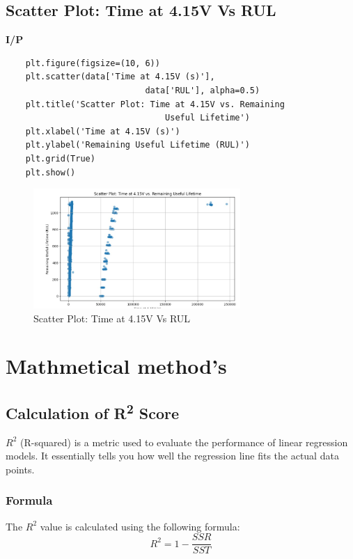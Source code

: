 \subsection{Scatter Plot: Time at 4.15V Vs RUL}
\noindent
\textbf{I/P} \\[-2.5em] %
\begin{verbatim}
    plt.figure(figsize=(10, 6)) 
    plt.scatter(data['Time at 4.15V (s)'],
                            data['RUL'], alpha=0.5) 
    plt.title('Scatter Plot: Time at 4.15V vs. Remaining 
                                Useful Lifetime') 
    plt.xlabel('Time at 4.15V (s)') 
    plt.ylabel('Remaining Useful Lifetime (RUL)') 
    plt.grid(True) 
    plt.show()    
\end{verbatim}
\begin{figure}[H]
    \centering
    \includegraphics[width=0.7\textwidth]{scatter_plot.jpg}
    \caption{Scatter Plot: Time at 4.15V Vs RUL}
    \label{fig:scatter_plot_min_voltage_vs_rul}
\end{figure}

\section{Mathmetical method's }
\subsection{Calculation of R\textsuperscript{2} Score}
$R^2$ (R-squared) is a metric used to evaluate the performance of linear regression models. It essentially tells you how well the regression line fits the actual data points.

\subsubsection{Formula}
The $R^2$ value is calculated using the following formula:
\begin{equation*}
    R^2 = 1 - \frac{SSR}{SST}
\end{equation*}


